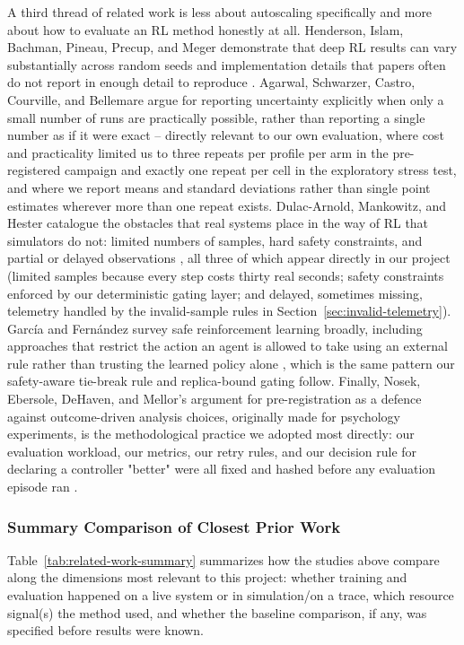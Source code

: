A third thread of related work is less about autoscaling specifically and
more about how to evaluate an RL method honestly at all. Henderson, Islam,
Bachman, Pineau, Precup, and Meger demonstrate that deep RL results can vary
substantially across random seeds and implementation details that papers
often do not report in enough detail to reproduce \cite{henderson2018matters}.
Agarwal, Schwarzer, Castro, Courville, and Bellemare argue for reporting
uncertainty explicitly when only a small number of runs are practically
possible, rather than reporting a single number as if it were exact
\cite{agarwal2021precipice} -- directly relevant to our own evaluation,
where cost and practicality limited us to three repeats per profile per arm
in the pre-registered campaign and exactly one repeat per cell in the
exploratory stress test, and where we report means and standard deviations
rather than single point estimates wherever more than one repeat exists.
Dulac-Arnold, Mankowitz, and Hester catalogue the obstacles that real
systems place in the way of RL that simulators do not: limited numbers of
samples, hard safety constraints, and partial or delayed observations
\cite{dulacarnold2019challenges}, all three of which appear directly in our
project (limited samples because every step costs thirty real seconds;
safety constraints enforced by our deterministic gating layer; and delayed,
sometimes missing, telemetry handled by the invalid-sample rules in
Section~\ref{sec:invalid-telemetry}). Garc\'ia and Fern\'andez survey safe
reinforcement learning broadly, including approaches that restrict the
action an agent is allowed to take using an external rule rather than
trusting the learned policy alone \cite{garcia2015safe}, which is the same
pattern our safety-aware tie-break rule and replica-bound gating follow.
Finally, Nosek, Ebersole, DeHaven, and Mellor's argument for pre-registration
as a defence against outcome-driven analysis choices, originally made for
psychology experiments, is the methodological practice we adopted most
directly: our evaluation workload, our metrics, our retry rules, and our
decision rule for declaring a controller "better" were all fixed and hashed
before any evaluation episode ran \cite{nosek2018preregistration}.

\subsubsection{Summary Comparison of Closest Prior Work}

Table~\ref{tab:related-work-summary} summarizes how the studies above
compare along the dimensions most relevant to this project: whether training
and evaluation happened on a live system or in simulation/on a trace,
which resource signal(s) the method used, and whether the baseline
comparison, if any, was specified before results were known.

